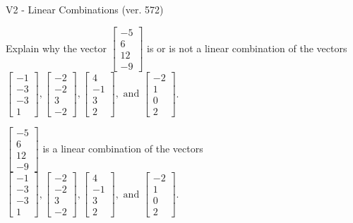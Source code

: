 \begin{exercise}
  \begin{exerciseTitle}V2 - Linear Combinations (ver. 572)\end{exerciseTitle}
  \begin{exerciseStatement}
    Explain why the vector \(\left[\begin{array}{c}
-5 \\
6 \\
12 \\
-9
\end{array}\right]\)  is or is not a linear 
	combination of the vectors \(\left[\begin{array}{c}
-1 \\
-3 \\
-3 \\
1
\end{array}\right] , \left[\begin{array}{c}
-2 \\
-2 \\
3 \\
-2
\end{array}\right] , \left[\begin{array}{c}
4 \\
-1 \\
3 \\
2
\end{array}\right] , \text{ and } \left[\begin{array}{c}
-2 \\
1 \\
0 \\
2
\end{array}\right]\).
	


  \end{exerciseStatement}
  \begin{exerciseAnswer}
   \(\left[\begin{array}{c}
-5 \\
6 \\
12 \\
-9
\end{array}\right]\) 
  	 is  
	a linear combination of the vectors \(\left[\begin{array}{c}
-1 \\
-3 \\
-3 \\
1
\end{array}\right] , \left[\begin{array}{c}
-2 \\
-2 \\
3 \\
-2
\end{array}\right] , \left[\begin{array}{c}
4 \\
-1 \\
3 \\
2
\end{array}\right] , \text{ and } \left[\begin{array}{c}
-2 \\
1 \\
0 \\
2
\end{array}\right]\).


\end{exerciseAnswer}
\end{exercise}
